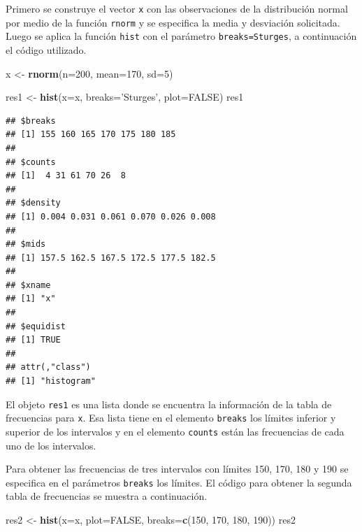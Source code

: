 \documentclass[10pt,]{krantz}
\makeatletter
\newenvironment{Shaded}{\begin{snugshade}}{\end{snugshade}}
\newcommand{\KeywordTok}[1]{\textcolor[rgb]{0.13,0.29,0.53}{\textbf{{#1}}}}
\newcommand{\DataTypeTok}[1]{\textcolor[rgb]{0.13,0.29,0.53}{{#1}}}
\newcommand{\DecValTok}[1]{\textcolor[rgb]{0.00,0.00,0.81}{{#1}}}
\newcommand{\StringTok}[1]{\textcolor[rgb]{0.31,0.60,0.02}{{#1}}}
\newcommand{\OtherTok}[1]{\textcolor[rgb]{0.56,0.35,0.01}{{#1}}}
\newcommand{\NormalTok}[1]{{#1}}
\newenvironment{kframe}{%
\medskip{}
\setlength{\fboxsep}{.8em}
 \def\at@end@of@kframe{}%
 \ifinner\ifhmode%
  \def\at@end@of@kframe{\end{minipage}}%
  \begin{minipage}{\columnwidth}%
 \fi\fi%
 \def\FrameCommand##1{\hskip\@totalleftmargin \hskip-\fboxsep
 \colorbox{shadecolor}{##1}\hskip-\fboxsep
     \hskip-\linewidth \hskip-\@totalleftmargin \hskip\columnwidth}%
 \MakeFramed {\advance\hsize-\width
   \@totalleftmargin\z@ \linewidth\hsize
   \@setminipage}}%
 {\par\unskip\endMakeFramed%
 \at@end@of@kframe}
\renewenvironment{Shaded}{\begin{kframe}}{\end{kframe}}
\makeatother
\begin{document}
Primero se construye el vector \texttt{x} con las observaciones de la
distribución normal por medio de la función \texttt{rnorm} y se
especifica la media y desviación solicitada. Luego se aplica la función
\texttt{hist} con el parámetro
\texttt{breaks=\textquotesingle{}Sturges\textquotesingle{}}, a
continuación el código utilizado.

\begin{Shaded}
\begin{Highlighting}[]
\NormalTok{x <-}\StringTok{ }\KeywordTok{rnorm}\NormalTok{(}\DataTypeTok{n=}\DecValTok{200}\NormalTok{, }\DataTypeTok{mean=}\DecValTok{170}\NormalTok{, }\DataTypeTok{sd=}\DecValTok{5}\NormalTok{)}

\NormalTok{res1 <-}\StringTok{ }\KeywordTok{hist}\NormalTok{(}\DataTypeTok{x=}\NormalTok{x, }\DataTypeTok{breaks=}\StringTok{'Sturges'}\NormalTok{, }\DataTypeTok{plot=}\OtherTok{FALSE}\NormalTok{)}
\NormalTok{res1}
\end{Highlighting}
\end{Shaded}

\begin{verbatim}
## $breaks
## [1] 155 160 165 170 175 180 185
## 
## $counts
## [1]  4 31 61 70 26  8
## 
## $density
## [1] 0.004 0.031 0.061 0.070 0.026 0.008
## 
## $mids
## [1] 157.5 162.5 167.5 172.5 177.5 182.5
## 
## $xname
## [1] "x"
## 
## $equidist
## [1] TRUE
## 
## attr(,"class")
## [1] "histogram"
\end{verbatim}

El objeto \texttt{res1} es una lista donde se encuentra la información
de la tabla de frecuencias para \texttt{x}. Esa lista tiene en el
elemento \texttt{breaks} los límites inferior y superior de los
intervalos y en el elemento \texttt{counts} están las frecuencias de
cada uno de los intervalos.

Para obtener las frecuencias de tres intervalos con límites 150, 170,
180 y 190 se especifica en el parámetros \texttt{breaks} los límites. El
código para obtener la segunda tabla de frecuencias se muestra a
continuación.

\begin{Shaded}
\begin{Highlighting}[]
\NormalTok{res2 <-}\StringTok{ }\KeywordTok{hist}\NormalTok{(}\DataTypeTok{x=}\NormalTok{x, }\DataTypeTok{plot=}\OtherTok{FALSE}\NormalTok{, }
             \DataTypeTok{breaks=}\KeywordTok{c}\NormalTok{(}\DecValTok{150}\NormalTok{, }\DecValTok{170}\NormalTok{, }\DecValTok{180}\NormalTok{, }\DecValTok{190}\NormalTok{))}
\NormalTok{res2}
\end{Highlighting}
\end{Shaded}
\end{document}
